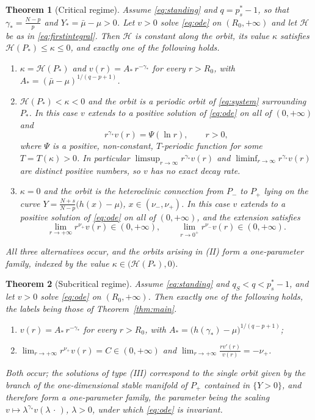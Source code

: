 \documentclass[11pt,reqno]{amsart}
\numberwithin{equation}{section}
\theoremstyle{plain}
\newtheorem{theorem}{Theorem}[section]
\theoremstyle{definition}
\newcommand{\mub}{\bar\mu}
\newcommand{\gs}{\gamma_{*}}
\begin{document}
\begin{theorem}[Critical regime]\label{thm:critical}
Assume \eqref{eq:standing} and $q=p^{*}_{s}-1$, so that $\gs=\frac{N-p}{p}$ and
$Y_{*}=\mub-\mu>0$. Let $v>0$ solve \eqref{eq:ode} on $(R_{0},+\infty)$ and let
$\mathcal H$ be as in \eqref{eq:firstintegral}. Then
$\mathcal H$ is constant along the orbit, its value $\kappa$ satisfies
$\mathcal H(P_{*})\le\kappa\le0$, and exactly one of the following holds.
\begin{enumerate}
\item[\rm(I)] $\kappa=\mathcal H(P_{*})$ and $v(r)=A_{*}\,r^{-\gs}$ for every
$r>R_{0}$, with $A_{*}=(\mub-\mu)^{1/(q-p+1)}$.
\item[\rm(II)] $\mathcal H(P_{*})<\kappa<0$ and the orbit is a periodic orbit
of \eqref{eq:system} surrounding $P_{*}$. In this case $v$ extends to a
positive solution of \eqref{eq:ode} on all of $(0,+\infty)$ and
\[
r^{\gs}v(r)=\Psi(\ln r),\qquad r>0,
\]
where $\Psi$ is a positive, non-constant, $T$-periodic function for some
$T=T(\kappa)>0$. In particular $\limsup_{r\to\infty}r^{\gs}v(r)$ and
$\liminf_{r\to\infty}r^{\gs}v(r)$ are distinct positive numbers, so $v$ has no
exact decay rate.
\item[\rm(III)] $\kappa=0$ and the orbit is the heteroclinic connection from
$P_{-}$ to $P_{+}$ lying on the curve
$Y=\frac{N+s}{N-p}\big(h(x)-\mu\big)$, $x\in(\nu_{-},\nu_{+})$. In this case
$v$ extends to a positive solution of \eqref{eq:ode} on all of $(0,+\infty)$,
and the extension satisfies
\[
\lim_{r\to+\infty}r^{\nu_{+}}v(r)\in(0,+\infty),
\qquad
\lim_{r\to0^{+}}r^{\nu_{-}}v(r)\in(0,+\infty) .
\]
\end{enumerate}
All three alternatives occur, and the orbits arising in {\rm(II)} form a
one-parameter family, indexed by the value
$\kappa\in\big(\mathcal H(P_{*}),0\big)$.
\end{theorem}

\begin{theorem}[Subcritical regime]\label{thm:sub}
Assume \eqref{eq:standing} and $q_{S}<q<p^{*}_{s}-1$, and let $v>0$ solve
\eqref{eq:ode} on $(R_{0},+\infty)$. Then exactly one of the following holds,
the labels being those of Theorem~\ref{thm:main}.
\begin{enumerate}
\item[\rm(I)] $v(r)=A_{*}\,r^{-\gs}$ for every $r>R_{0}$, with
$A_{*}=\big(h(\gs)-\mu\big)^{1/(q-p+1)}$;
\item[\rm(III)] $\displaystyle\lim_{r\to+\infty}r^{\nu_{+}}v(r)=C\in(0,+\infty)$
and $\displaystyle\lim_{r\to+\infty}\frac{rv'(r)}{v(r)}=-\nu_{+}$.
\end{enumerate}
Both occur; the solutions of type {\rm(III)} correspond to the single orbit
given by the branch of the one-dimensional stable manifold of $P_{+}$ contained
in $\{Y>0\}$, and therefore form a one-parameter family, the parameter being
the scaling $v\mapsto\lambda^{\gs}v(\lambda\,\cdot\,)$, $\lambda>0$, under
which \eqref{eq:ode} is invariant.
\end{theorem}
\end{document}
